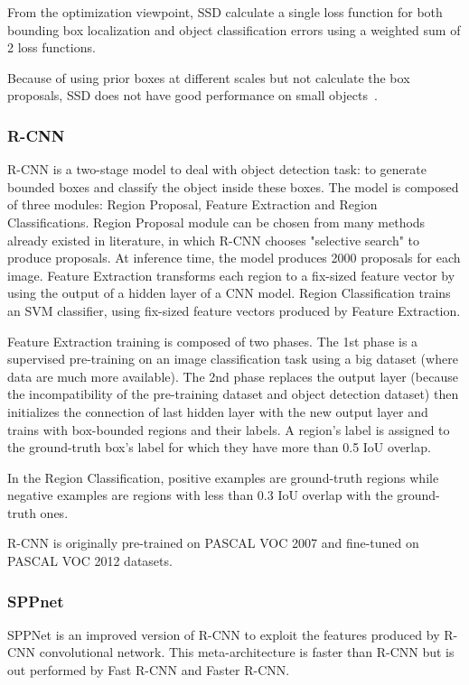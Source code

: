 \documentclass[conference]{IEEEtran}
\begin{document}
From the optimization viewpoint, SSD calculate a single loss function for both bounding box localization and object classification errors using a weighted sum of 2 loss functions. 

Because of using prior boxes at different scales but not calculate the box proposals, SSD does not have good performance on small objects~\cite{liu2016ssd}.


\subsubsection{R-CNN }
R-CNN is a two-stage model to deal with object detection task: to generate bounded boxes and classify the object inside these boxes. The model is composed of three modules: Region Proposal, Feature Extraction and Region Classifications. Region Proposal module can be chosen from many methods already existed in literature, in which R-CNN chooses "selective search" to produce proposals. At inference time, the model produces 2000 proposals for each image. Feature Extraction transforms each region to a fix-sized feature vector by using the output of a hidden layer of a CNN model. Region Classification trains an SVM classifier, using fix-sized feature vectors produced by Feature Extraction.

Feature Extraction training is composed of two phases. The 1st phase is a supervised pre-training on an image classification task using a big dataset (where data are much more available). The 2nd phase replaces the output layer (because the incompatibility of the pre-training dataset and object detection dataset) then initializes the connection of last hidden layer with the new output layer and trains with box-bounded regions and their labels. A region's label is assigned to the ground-truth box's label for which they have more than 0.5 IoU overlap.

In the Region Classification, positive examples are ground-truth regions while negative examples are regions with less than 0.3 IoU overlap with the ground-truth ones.

R-CNN is originally pre-trained on PASCAL VOC 2007 and fine-tuned on PASCAL VOC 2012 datasets. 

\subsubsection{SPPnet}
SPPNet is an improved version of R-CNN to exploit the features produced by R-CNN convolutional network. This meta-architecture is faster than R-CNN but is out performed by Fast R-CNN and Faster R-CNN.
\end{document}

